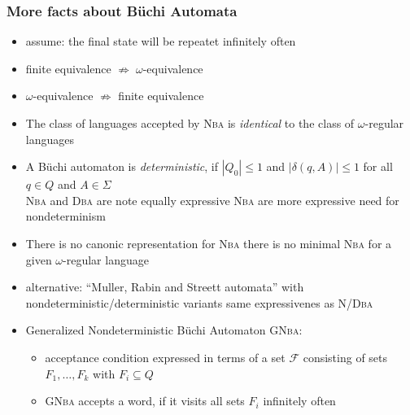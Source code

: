 \documentclass[a4paper, 10pt]{article}
\begin{document}
\subsubsection*{More facts about Büchi Automata}
\begin{itemize}
    \item assume: the final state will be repeatet infinitely often
    \item finite equivalence $\not\Rightarrow\;\omega$-equivalence
    \item $\omega$-equivalence $\not\Rightarrow$ finite equivalence
    \item The class of languages accepted by \textsc{Nba} is \emph{identical} to the class of $\omega$-regular languages
    \item A Büchi automaton is \emph{deterministic}, if $|Q_0|\leq 1$ and $|\delta(q,A)|\leq1$ for all $q\in Q$ and $A\in\Sigma$ \\
    \textsc{Nba} and \textsc{Dba} are note equally expressive \follows \textsc{Nba} are more expressive \follows need for nondeterminism
    \item There is no canonic representation for \textsc{Nba} \follows there is no minimal \textsc{Nba} for a given $\omega$-regular language
    \item alternative: ``Muller, Rabin and Streett automata'' with nondeterministic/deterministic variants \follows same expressivenes as \textsc{N/Dba}
    \item Generalized Nondeterministic Büchi Automaton \textsc{GNba}:
    \begin{itemize}
        \item acceptance condition expressed in terms of a set $\mathcal{F}$ consisting of sets $F_1,\dots,F_k$ with $F_i\subseteq Q$
        \item \textsc{GNba} accepts a word, if it visits all sets $F_i$ infinitely often
    \end{itemize}
\end{itemize}
\end{document}
